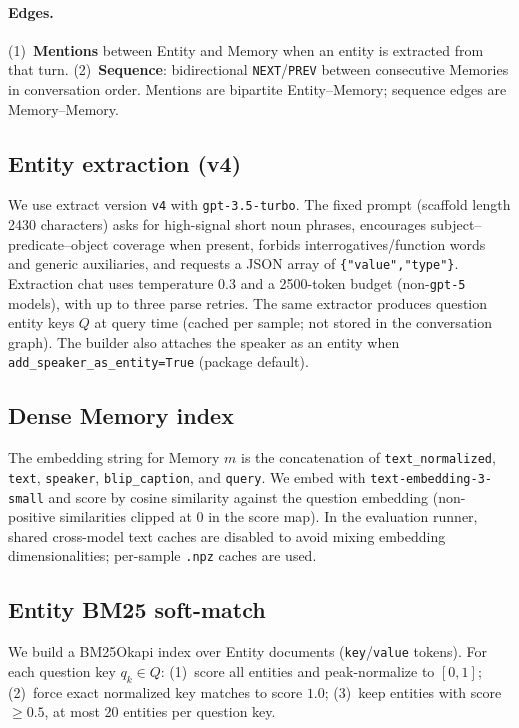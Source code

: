 \documentclass[11pt]{article}
\begin{document}
\paragraph{Edges.}
(1)~\textbf{Mentions} between Entity and Memory when an entity is extracted from that turn.
(2)~\textbf{Sequence}: bidirectional \texttt{NEXT}/\texttt{PREV} between consecutive Memories in conversation order.
Mentions are bipartite Entity--Memory; sequence edges are Memory--Memory.

\subsection{Entity extraction (v4)}
\label{sec:extract}

We use extract version \texttt{v4} with \texttt{gpt-3.5-turbo}.
The fixed prompt (scaffold length 2430 characters) asks for high-signal short noun phrases, encourages subject--predicate--object coverage when present, forbids interrogatives/function words and generic auxiliaries, and requests a JSON array of \texttt{\{"value","type"\}}.
Extraction chat uses temperature $0.3$ and a 2500-token budget (non-\texttt{gpt-5} models), with up to three parse retries.
The same extractor produces question entity keys $Q$ at query time (cached per sample; not stored in the conversation graph).
The builder also attaches the speaker as an entity when \texttt{add\_speaker\_as\_entity=True} (package default).

\subsection{Dense Memory index}
\label{sec:embed}

The embedding string for Memory $m$ is the concatenation of
\texttt{text\_normalized}, \texttt{text}, \texttt{speaker}, \texttt{blip\_caption}, and \texttt{query}.
We embed with \texttt{text-embedding-3-small} and score by cosine similarity against the question embedding (non-positive similarities clipped at 0 in the score map).
In the evaluation runner, shared cross-model text caches are disabled to avoid mixing embedding dimensionalities; per-sample \texttt{.npz} caches are used.

\subsection{Entity BM25 soft-match}
\label{sec:bm25}

We build a BM25Okapi index over Entity documents (\texttt{key}/\texttt{value} tokens).
For each question key $q_k\in Q$:
(1)~score all entities and peak-normalize to $[0,1]$;
(2)~force exact normalized key matches to score $1.0$;
(3)~keep entities with score $\ge 0.5$, at most 20 entities per question key.
\end{document}
